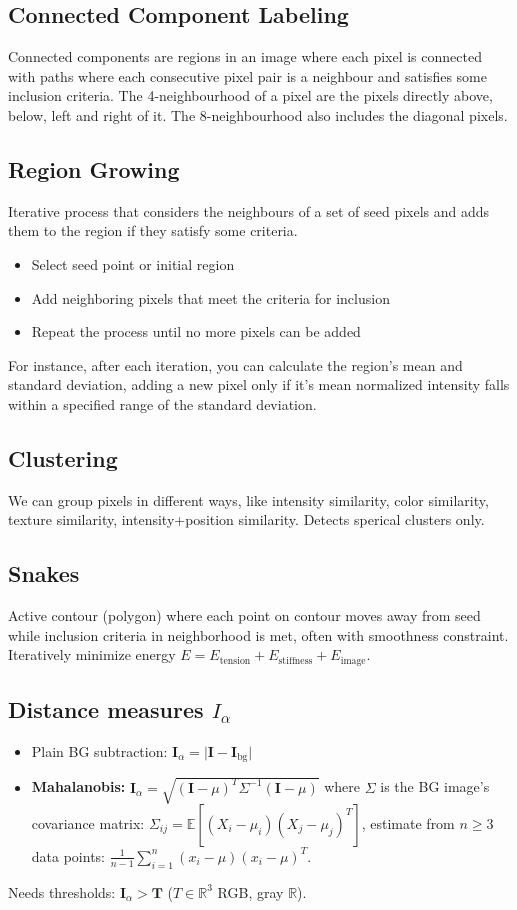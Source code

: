 \documentclass[a4paper,9pt]{article}
\begin{document}
\subsection{Connected Component Labeling}
Connected components are regions in an image where each pixel is connected with paths where
each consecutive pixel pair is a neighbour and satisfies some inclusion criteria. The 4-neighbourhood 
of a pixel are the pixels directly above, below, left and right of it. The 8-neighbourhood also includes the diagonal pixels.
\subsection{Region Growing}
Iterative process that considers the neighbours of a set of seed pixels and adds them to the region if they satisfy some criteria.
\begin{itemize}
  \item Select seed point or initial region
  \item Add neighboring pixels that meet the criteria for inclusion 
  \item Repeat the process until no more pixels can be added

\end{itemize}
For instance, after each iteration, you can calculate the region's mean and standard deviation,
adding a new pixel only if it's mean normalized intensity falls within a specified range
of the standard deviation.
\subsection{Clustering}
We can group pixels in different ways, like intensity similarity, color similarity, texture similarity, intensity+position similarity.
Detects sperical clusters only.
\subsection{Snakes}
Active contour (polygon) where each point on contour moves away from seed while inclusion criteria in neighborhood is met, often with smoothness constraint. Iteratively minimize energy $E = E_{\text{tension}} + E_{\text{stiffness}} + E_{\text{image}}$.
\subsection{Distance measures $I_\alpha$}
\begin{itemize}
  \item Plain BG subtraction: $\mathbf{I}_\alpha = \lvert\mathbf{I} - \mathbf{I}_{\text{bg}}\rvert$
  \item \textbf{Mahalanobis:} $\mathbf{I}_\alpha = \sqrt{(\mathbf{I} - \mu)^T \Sigma^{-1} (\mathbf{I} - \mu)}$ where $\Sigma$ is the BG image's covariance matrix: $\Sigma_{ij} = \mathbb{E}[(X_i - \mu_i)(X_j - \mu_j)^T]$, estimate from $n \ge 3$ data points: $\frac{1}{n-1}\sum_{i=1}^n (x_i - \mu)(x_i - \mu)^T$.
\end{itemize}
Needs thresholds: $\mathbf{I}_\alpha > \mathbf{T}$ ($T \in \mathbb{R}^3$ RGB, gray $\mathbb{R}$).
\end{document}
